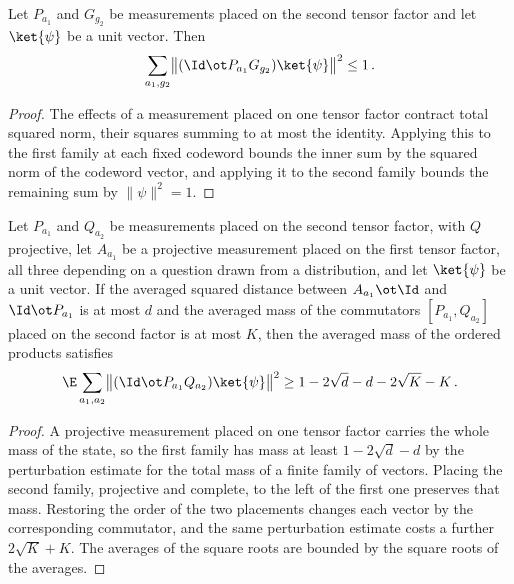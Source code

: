 \begin{lemma}
	\label{lem:pasting-ordered-product-mass}
	\leanok
	Let $P_{a_1}$ and $G_{g_2}$ be measurements placed on the second tensor
	factor and let $\ket{\psi}$ be a unit vector. Then
	\[
		\sum_{a_1, g_2} \bigl\| (\Id \ot P_{a_1} G_{g_2}) \ket{\psi} \bigr\|^2
			\le 1\,.
	\]
\end{lemma}
\begin{proof}
	\leanok
	The effects of a measurement placed on one tensor factor contract total
	squared norm, their squares summing to at most the identity. Applying this
	to the first family at each fixed codeword bounds the inner sum by the
	squared norm of the codeword vector, and applying it to the second family
	bounds the remaining sum by $\|\psi\|^2 = 1$.
\end{proof}

\begin{lemma}
	\label{lem:pasting-ordered-product-mass-lower}
	\leanok
	Let $P_{a_1}$ and $Q_{a_2}$ be measurements placed on the second tensor
	factor, with $Q$ projective, let $A_{a_1}$ be a projective measurement
	placed on the first tensor factor, all three depending on a question drawn
	from a distribution, and let $\ket{\psi}$ be a unit vector. If the averaged
	squared distance between $A_{a_1} \ot \Id$ and $\Id \ot P_{a_1}$ is at most
	$d$ and the averaged mass of the commutators $[P_{a_1}, Q_{a_2}]$ placed on
	the second factor is at most $K$, then the averaged mass of the ordered
	products satisfies
	\[
		\E \sum_{a_1, a_2}
			\bigl\| (\Id \ot P_{a_1} Q_{a_2}) \ket{\psi} \bigr\|^2
			\ge 1 - 2\sqrt{d} - d - 2\sqrt{K} - K\,.
	\]
\end{lemma}
\begin{proof}
	\leanok
	A projective measurement placed on one tensor factor carries the whole mass
	of the state, so the first family has mass at least $1 - 2\sqrt{d} - d$ by
	the perturbation estimate for the total mass of a finite family of vectors.
	Placing the second family, projective and complete, to the left of the first
	one preserves that mass. Restoring the order of the two placements changes
	each vector by the corresponding commutator, and the same perturbation
	estimate costs a further $2\sqrt{K} + K$. The averages of the square roots
	are bounded by the square roots of the averages.
\end{proof}

